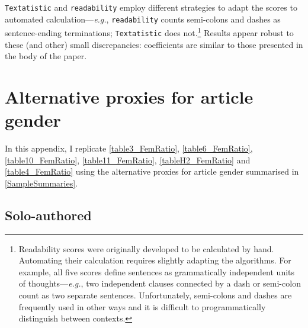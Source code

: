 \begin{appendices}
\begin{refsection}
\texttt{Textatistic} and \texttt{readability} employ different strategies to adapt the scores to automated calculation---\emph{e.g.}, \texttt{readability} counts semi-colons and dashes as sentence-ending terminations; \texttt{Textatistic} does not.\footnote{Readability scores were originally developed to be calculated by hand. Automating their calculation requires slightly adapting the algorithms. For example, all five scores define sentences as grammatically independent units of thoughts---\emph{e.g.}, two independent clauses connected by a dash or semi-colon count as two separate sentences. Unfortunately, semi-colons and dashes are frequently used in other ways and it is difficult to programmatically distinguish between contexts.} Results appear robust to these (and other) small discrepancies: coefficients are similar to those presented in the body of the paper.



\clearpage

\clearpage

\clearpage

\clearpage


\section{Alternative proxies for article gender}
\label{appendixalternativemeasure}

In this appendix, I replicate \autoref{table3_FemRatio}, \autoref{table6_FemRatio}, \autoref{table10_FemRatio}, \autoref{table11_FemRatio}, \autoref{tableH2_FemRatio} and \autoref{table4_FemRatio} using the alternative proxies for article gender summarised in \autoref{SampleSummaries}.



\subsection{Solo-authored}
\label{appendixsolo}


\begin{vplace}[0.7]

\end{vplace}
\clearpage

\clearpage

\clearpage

\clearpage

\clearpage

\clearpage



\end{refsection}
\end{appendices}
